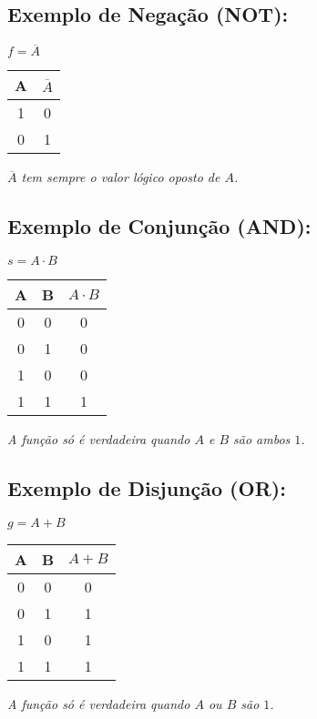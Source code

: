 \documentclass[12pt]{article}
\begin{document}
\subsection*{Exemplo de Negação (\textbf{NOT}): }
$ f = \overline{A}$
\begin{center}
\begin{tabular}{|c|c|}
\hline
A & \( \overline{A} \) \\
\hline
1 & 0 \\
0 & 1 \\
\hline
\end{tabular}

\vspace{0.5em}
\textit{$\overline{A}$ tem sempre o valor lógico oposto de $A$.}
\end{center}

\subsection*{Exemplo de Conjunção (\textbf{AND}): }
$ s = A \cdot B$
\begin{center}
\begin{tabular}{|c|c|c|}
\hline
A & B & \( A \cdot B \) \\
\hline
0 & 0 & 0 \\
0 & 1 & 0 \\
1 & 0 & 0 \\
1 & 1 & 1 \\ 
\hline
\end{tabular}

\vspace{0.5em}
\textit{A função só é verdadeira quando $A$ e $B$ são ambos $1$.}
\end{center}

\subsection*{Exemplo de Disjunção (\textbf{OR}):}
$ g = A + B$
\begin{center}
\begin{tabular}{|c|c|c|}
\hline
A & B & \( A + B \) \\
\hline
0 & 0 & 0 \\
0 & 1 & 1 \\
1 & 0 & 1 \\
1 & 1 & 1 \\ 
\hline
\end{tabular}

\vspace{0.5em}
\textit{A função só é verdadeira quando $A$ ou $B$ são $1$.}
\end{center}
\end{document}
